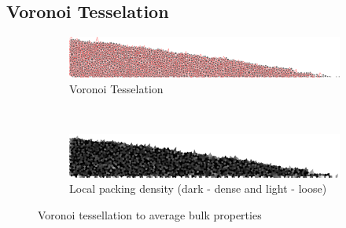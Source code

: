 \subsection{Voronoi Tesselation}
\begin{figure}[tbhp]
\centering
\begin{subfigure}[b]{0.95\textwidth}
\centering
\includegraphics[width=\textwidth]{tesselation}
\caption{Voronoi Tesselation}
\label{fig:tesselation}
\end{subfigure}
\\
\begin{subfigure}[b]{0.95\textwidth}
\centering
\includegraphics[width=\textwidth]{local_density}
\caption{Local packing density (dark - dense and light - loose)}
\label{fig:local_density}
\end{subfigure}
\caption{Voronoi tessellation to average bulk properties}
\label{fig:voro}
\end{figure}
